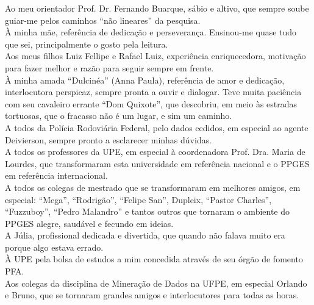 Ao meu orientador Prof. Dr. Fernando Buarque, sábio e altivo, que sempre soube guiar-me pelos caminhos ``não lineares''  da pesquisa.\\

À minha mãe, referência de dedicação e perseverança. Ensinou-me quase tudo que sei, principalmente o gosto pela leitura.\\

Aos meus filhos Luiz Fellipe e Rafael Luiz, experiência enriquecedora, motivação para fazer melhor e razão para seguir sempre em frente.\\

À minha amada ``Dulcinéa'' (Anna Paula), referência de amor e dedicação, interlocutora perspicaz, sempre pronta a ouvir e dialogar. Teve muita paciência com seu cavaleiro errante ``Dom Quixote'', que descobriu, em meio às estradas tortuosas, que o fracasso não é um lugar, e sim um caminho.\\

A todos da Polícia Rodoviária Federal, pelo dados cedidos, em especial ao agente Deivierson,  sempre pronto a esclarecer minhas dúvidas.\\

A todos os professores da UPE, em especial à coordenadora Prof. Dra. Maria de Lourdes, que transformaram esta universidade em referência nacional e o PPGES em referência internacional.\\

A todos os colegas de mestrado que se transformaram em melhores amigos, em especial: ``Mega'', ``Rodrigão'', ``Felipe San'', Dupleix, ``Pastor Charles'', ``Fuzzuboy'', ``Pedro Malandro'' e tantos outros que tornaram o ambiente do PPGES alegre, saudável e fecundo em ideias.\\

A Júlia, profissional dedicada e divertida, que quando não falava muito era porque algo estava errado.\\

À UPE pela bolsa de estudos a mim concedida através de seu órgão de fomento PFA.\\

Aos colegas da disciplina de Mineração de Dados na UFPE, em especial Orlando e Bruno, que se tornaram grandes amigos e interlocutores para todas as horas.

